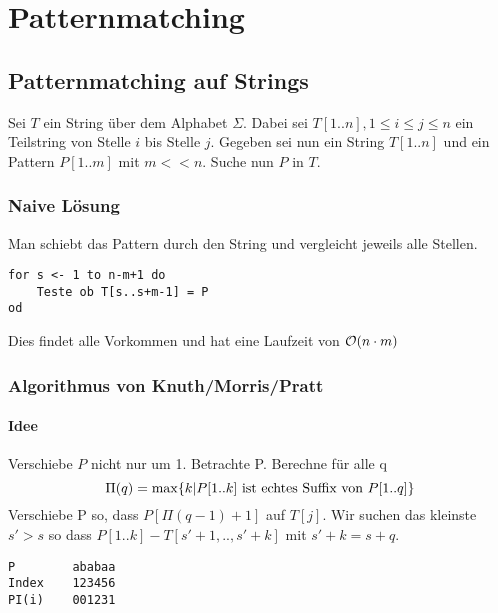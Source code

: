 %

\chapter{Patternmatching} 			
    \section{Patternmatching auf Strings}
        Sei $T$ ein String über dem Alphabet $\Sigma$. Dabei sei $T[1..n], 1 \leq i \leq j \leq n$ ein Teilstring von Stelle $i$ bis Stelle $j$. Gegeben sei nun ein String $T[1..n]$ und ein Pattern $P[1..m]$ mit $m << n$. Suche nun $P$ in $T$.
        
        \subsection{Naive Lösung}
            Man schiebt das Pattern durch den String und vergleicht jeweils alle Stellen.
\begin{verbatim}
for s <- 1 to n-m+1 do
    Teste ob T[s..s+m-1] = P
od
\end{verbatim}
            Dies findet alle Vorkommen und hat eine Laufzeit von $\mathcal{O}(n \cdot m )$
            
        \subsection{Algorithmus von Knuth/Morris/Pratt}
            \subsubsection{Idee}
                Verschiebe $P$ nicht nur um 1. Betrachte P. Berechne für alle q
                $$
                    \Pi(q) = \max \{k | P[1..k] \text{ ist echtes Suffix von } P[1..q]\}
                $$
                Verschiebe P so, dass $P[\Pi(q-1)+1]$ auf $T[j]$. Wir suchen das kleinste $s' > s$ so dass $P[1..k]-T[s'+1,..,s'+k]$ mit $s'+k = s + q$.
\begin{verbatim}
P        ababaa
Index    123456
PI(i)    001231
\end{verbatim}
